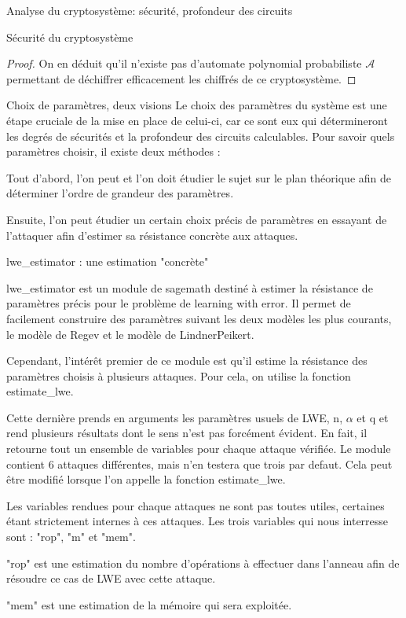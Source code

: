 \begin{section}{Analyse du cryptosystème: sécurité, profondeur des circuits}
\begin{subsection}{Sécurité du cryptosystème}
\begin{proof}
	On en déduit qu'il n'existe pas d'automate polynomial probabiliste
	$\mathcal{A}$ permettant de déchiffrer efficacement les chiffrés de ce cryptosystème.
	\end{proof}
	
	\end{subsection}
	\begin{subsection}{Choix de paramètres, deux visions}
	Le choix des paramètres du système est une étape cruciale de la mise en place de celui-ci,
	car ce sont eux qui détermineront les degrés de sécurités et la profondeur des circuits calculables.
	Pour savoir quels paramètres choisir, il existe deux méthodes :
	
	Tout d'abord, l'on peut et l'on doit étudier le sujet sur le plan théorique afin de déterminer
	l'ordre de grandeur des paramètres.
	
	Ensuite, l'on peut étudier un certain choix précis de paramètres en essayant de l'attaquer afin
	d'estimer sa résistance concrète aux attaques.
	
	\begin{subsubsection}{lwe\_estimator : une estimation "concrète"}
	
	lwe\_estimator est un module de sagemath destiné à estimer la résistance de paramètres précis pour
	le problème de learning with error. Il permet de facilement construire des paramètres suivant les
	deux modèles les plus courants, le modèle de Regev et le modèle de LindnerPeikert.
	
	Cependant, l'intérêt premier de ce module est qu'il estime la résistance des paramètres choisis à
	plusieurs attaques. Pour cela, on utilise la fonction estimate\_lwe.
	
	Cette dernière prends en arguments les paramètres usuels de LWE, n, $\alpha$ et q et rend plusieurs
	résultats dont le sens n'est pas forcément évident. En fait, il retourne tout un ensemble de
	variables pour chaque attaque vérifiée. Le module contient 6 attaques différentes, mais n'en testera
	que trois par defaut. Cela peut être modifié lorsque l'on appelle la fonction estimate_lwe.
	
	Les variables rendues pour chaque attaques ne sont pas toutes utiles, certaines étant strictement
	internes à ces attaques. Les trois variables qui nous interresse sont : "rop", "m" et "mem".
	
	"rop" est une estimation du nombre d'opérations à effectuer dans l'anneau afin de résoudre ce cas
	de LWE avec cette attaque.
	
	"mem" est une estimation de la mémoire qui sera exploitée.
	

\end{subsubsection}
\end{subsection}
\end{section}
